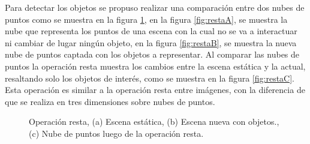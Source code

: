         Para detectar los objetos se propuso realizar una comparación entre dos nubes de puntos como se muestra en la figura \ref{fig:resta}, en la figura \ref{fig:restaA}, se muestra la nube que representa los puntos de una escena con la cual no se va a interactuar ni cambiar de lugar ningún objeto, en la figura \ref{fig:restaB}, se muestra la nueva nube de puntos captada con los objetos a representar. Al comparar las nubes de puntos la operación resta muestra los cambios entre la escena estática y la actual, resaltando solo los objetos de interés, como se muestra en la figura \ref{fig:restaC}. 
        Esta operación es similar a la operación resta entre imágenes, con la diferencia de que se realiza en tres dimensiones sobre nubes de puntos. \\
        
        
        \begin{figure}[!htb] 
        	\centering
        	\caption[Operación resta.]{Operación resta, (a) Escena estática, (b) Escena nueva con objetos., (c) Nube de puntos luego de la operación resta.} 
        	\label{fig:resta}
        \end{figure}
        
